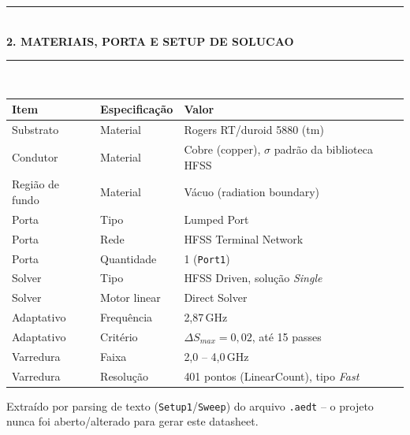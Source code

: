 \documentclass[10pt,a4paper]{article}
\newcommand{\legend}[1]{\par\vspace{2pt}\footnotesize\color{steel}#1}
\newenvironment{panel}[1]{%
  \par\noindent\textcolor{unbblue}{\rule{\textwidth}{1.1pt}}\\[1pt]
  {\bfseries\color{unbblue} #1}\\[2pt]
  \textcolor{unbblue}{\rule{\textwidth}{0.4pt}}\\[4pt]
}{%
  \par\vspace{2pt}
}
\begin{document}
\begin{panel}{2. MATERIAIS, PORTA E SETUP DE SOLUCAO}
\begin{center}
\renewcommand{\arraystretch}{1.15}
\begin{tabular}{lll}
\toprule
\textbf{Item} & \textbf{Especificação} & \textbf{Valor} \\
\midrule
Substrato & Material & Rogers RT/duroid 5880 (tm) \\
Condutor  & Material & Cobre (copper), $\sigma$ padrão da biblioteca HFSS \\
Região de fundo & Material & Vácuo (radiation boundary) \\
\midrule
Porta & Tipo & Lumped Port \\
Porta & Rede & HFSS Terminal Network \\
Porta & Quantidade & 1 (\texttt{Port1}) \\
\midrule
Solver & Tipo & HFSS Driven, solu\c{c}\~ao \emph{Single} \\
Solver & Motor linear & Direct Solver \\
Adaptativo & Frequ\^encia & 2,87\,GHz \\
Adaptativo & Crit\'erio & $\Delta S_{max}=0{,}02$, at\'e 15 passes \\
Varredura & Faixa & 2,0 -- 4,0\,GHz \\
Varredura & Resolu\c{c}\~ao & 401 pontos (LinearCount), tipo \emph{Fast} \\
\bottomrule
\end{tabular}
\end{center}
\legend{Extra\'ido por parsing de texto (\texttt{Setup1}/\texttt{Sweep}) do
arquivo \texttt{.aedt} -- o projeto nunca foi aberto/alterado para gerar
este datasheet.}
\end{panel}

\clearpage
\end{document}
